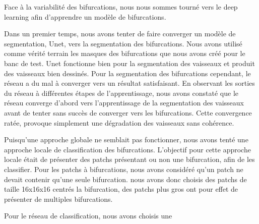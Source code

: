 Face à la variabilité des bifurcations, nous nous sommes tourné vers le deep learning afin d'apprendre un modèle de bifurcations. 

Dans un premier temps, nous avons tenter de faire converger un modèle de segmentation, Unet, vers la segmentation des bifurcations. Nous avons utilisé comme vérité terrain les masques des bifurcations que nous avons créé pour le banc de test. Unet fonctionne bien pour la segmentation des vaisseaux et produit des vaisseaux bien dessinés. Pour la segmentation des bifurcations cependant, le réseau a du mal à converger vers un résultat satisfaisant. En observant les sorties du réseau à différentes étapes de l'apprentissage, nous avons constaté que le réseau converge d'abord vers l'apprentissage de la segmentation des vaisseaux avant de tenter sans succès de converger vers les bifurcations. Cette convergence ratée, provoque simplement une dégradation des vaisseaux sans cohérence. 

Puisqu'une approche globale ne semblait pas fonctionner, nous avons tenté une approche locale de classification des bifurcations. L'objectif pour cette approche locale était de présenter des patchs présentant ou non une bifurcation, afin de les classifier. Pour les patchs à bifurcations, nous avons considéré qu'un patch ne devait contenir qu'une seule bifurcation. nous avons donc choisis des patchs de taille 16x16x16 centrés la bifurcation, des patchs plus gros ont pour effet de présenter de multiples bifurcations. 

Pour le réseau de classification, nous avons choisis une 
